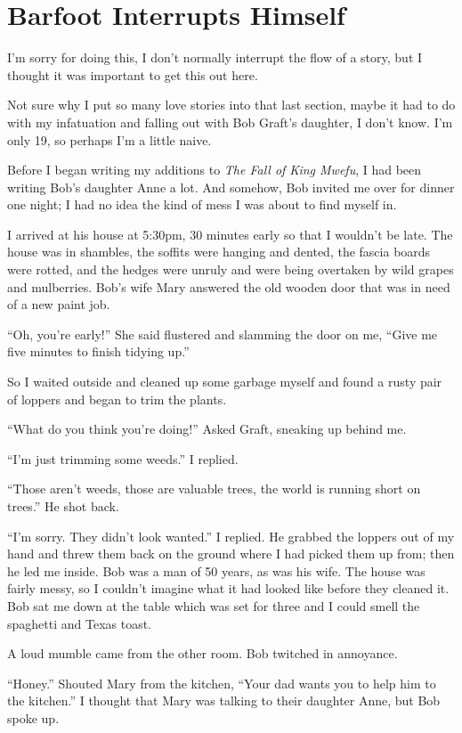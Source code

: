 \section{Barfoot Interrupts Himself}
I'm sorry for doing this, I don't normally interrupt the flow of a story, but I thought it was important to get this out here.

Not sure why I put so many love stories into that last section, maybe it had to do with my infatuation and falling out with Bob Graft's daughter, I don't know. I'm only 19, so perhaps I'm a little naive.

Before I began writing my additions to \emph{The Fall of King Mwe\-fu},
I had been writing Bob's daughter Anne a lot. And somehow, Bob invited me over for dinner one night; I had no idea the kind of mess I was about to find myself in.

I arrived at his house at 5:30pm, 30 minutes early so that I wouldn't be late. The house was in shambles, the soffits were hanging and dented, the fascia boards were rotted, and the hedges were unruly and were being overtaken by wild grapes and mulberries. Bob's wife Mary answered the old wooden door that was in need of a new paint job.

``Oh, you're early!'' She said flustered and slamming the door on me, ``Give me five minutes to finish tidying up.''

So I waited outside and cleaned up some garbage myself and found a rusty pair of loppers and began to trim the plants.

``What do you think you're doing!'' Asked Graft, sneaking up behind me.

``I'm just trimming some weeds.'' I replied.

``Those aren't weeds, those are valuable trees, the world is running short on trees.'' He shot back.

``I'm sorry. They didn't look wanted.'' I replied. He grabbed the loppers out of my hand and threw them back on the ground where I had picked them up from; then he led me inside. Bob was a man of 50 years, as was his wife.
The house was fairly messy, so I couldn't imagine what it had looked like before they cleaned it.
Bob sat me down at the table which was set for three and I could smell the spaghetti and Texas toast.

A loud mumble came from the other room. Bob twi\-tched in annoyance.

``Honey.'' Shouted Mary from the kitchen, ``Your dad wants you to help him to the kitchen.''
I thought that Mary was talking to their daughter Anne, but Bob spoke up.

